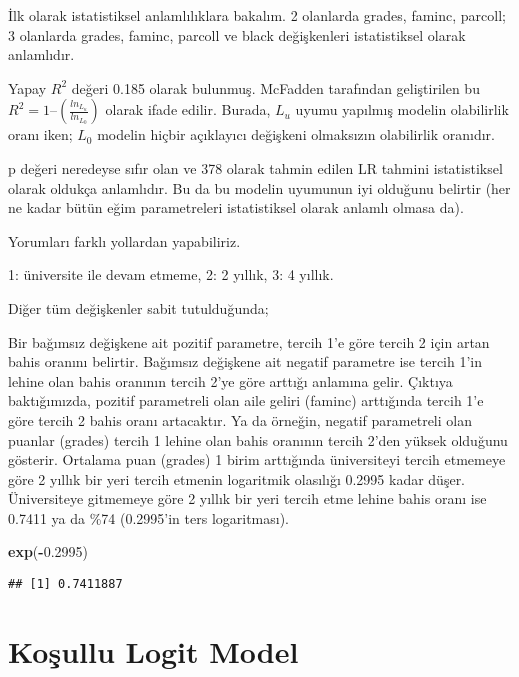 \documentclass[
]{book}
\newenvironment{Shaded}{\begin{snugshade}}{\end{snugshade}}
\newcommand{\FloatTok}[1]{\textcolor[rgb]{0.00,0.00,0.81}{#1}}
\newcommand{\KeywordTok}[1]{\textcolor[rgb]{0.13,0.29,0.53}{\textbf{#1}}}
\newcommand{\NormalTok}[1]{#1}
\newcommand{\OperatorTok}[1]{\textcolor[rgb]{0.81,0.36,0.00}{\textbf{#1}}}
\begin{document}
İlk olarak istatistiksel anlamlılıklara bakalım. 2 olanlarda grades, faminc, parcoll; 3 olanlarda grades, faminc, parcoll ve black değişkenleri istatistiksel olarak anlamlıdır.

Yapay \(R^2\) değeri 0.185 olarak bulunmuş. McFadden tarafından geliştirilen bu \(R^2 = 1 – (\frac{ln_{L_u}}{ln_{L_0}})\) olarak ifade edilir. Burada, \(L_u\) uyumu yapılmış modelin olabilirlik oranı iken; \(L_0\) modelin hiçbir açıklayıcı değişkeni olmaksızın olabilirlik oranıdır.

p değeri neredeyse sıfır olan ve 378 olarak tahmin edilen LR tahmini istatistiksel olarak oldukça anlamlıdır. Bu da bu modelin uyumunun iyi olduğunu belirtir (her ne kadar bütün eğim parametreleri istatistiksel olarak anlamlı olmasa da).

Yorumları farklı yollardan yapabiliriz.

1: üniversite ile devam etmeme, 2: 2 yıllık, 3: 4 yıllık.

Diğer tüm değişkenler sabit tutulduğunda;

Bir bağımsız değişkene ait pozitif parametre, tercih 1'e göre tercih 2 için artan bahis oranını belirtir. Bağımsız değişkene ait negatif parametre ise tercih 1'in lehine olan bahis oranının tercih 2'ye göre arttığı anlamına gelir. Çıktıya baktığımızda, pozitif parametreli olan aile geliri (faminc) arttığında tercih 1'e göre tercih 2 bahis oranı artacaktır. Ya da örneğin, negatif parametreli olan puanlar (grades) tercih 1 lehine olan bahis oranının tercih 2'den yüksek olduğunu gösterir. Ortalama puan (grades) 1 birim arttığında üniversiteyi tercih etmemeye göre 2 yıllık bir yeri tercih etmenin logaritmik olasılığı 0.2995 kadar düşer. Üniversiteye gitmemeye göre 2 yıllık bir yeri tercih etme lehine bahis oranı ise 0.7411 ya da \%74 (0.2995'in ters logaritması).

\begin{Shaded}
\begin{Highlighting}[]
\KeywordTok{exp}\NormalTok{(}\OperatorTok{-}\FloatTok{0.2995}\NormalTok{)}
\end{Highlighting}
\end{Shaded}

\begin{verbatim}
## [1] 0.7411887
\end{verbatim}

\hypertarget{koux15fullu-logit-model}{%
\section{Koşullu Logit Model}\label{koux15fullu-logit-model}}
\end{document}

